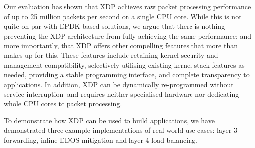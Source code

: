 \documentclass[10pt,sigconf,anonymous]{acmart}
\begin{document}
Our evaluation has shown that XDP achieves raw packet processing performance of
up to 25 million packets per second on a single CPU core. While this is not
quite on par with DPDK-based solutions, we argue that there is nothing
preventing the XDP architecture from fully achieving the same performance; and
more importantly, that XDP offers other compelling features that more than makes
up for this. These features include retaining kernel security and management
compatibility, selectively utilising existing kernel stack features as needed,
providing a stable programming interface, and complete transparency to
applications. In addition, XDP can be dynamically re-programmed without service
interruption, and requires neither specialised hardware nor dedicating whole CPU
cores to packet processing.

To demonstrate how XDP can be used to build applications, we have demonstrated
three example implementations of real-world use cases: layer-3 forwarding,
inline DDOS mitigation and layer-4 load balancing.



\end{document}
